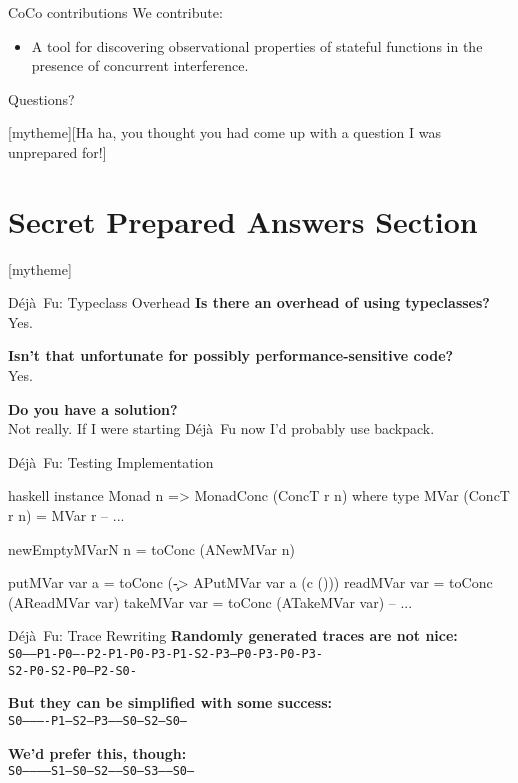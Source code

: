 \documentclass{beamer}
\newcommand{\sectiontext}[2]{%
\setbeamertemplate{section page}[mytheme][#2]%
\section{#1}%
\setbeamertemplate{section page}[mytheme]}
\newcommand{\dejafu}{D\'{e}j\`{a}~Fu}
\begin{document}
\begin{frame}{CoCo contributions}
  We contribute:

  \begin{itemize}
  \item A tool for discovering observational properties of stateful
    functions in the presence of concurrent interference.
\end{itemize}
\end{frame}

\begin{frame}[standout]
  Questions?
\end{frame}

\appendix

\sectiontext{Secret Prepared Answers Section}{Ha ha, you thought you had come up with a question I was unprepared for!}

\begin{frame}{\dejafu{}: Typeclass Overhead}
  \textbf{Is there an overhead of using typeclasses?}\\
  Yes.

  \textbf{Isn't that unfortunate for possibly performance-sensitive code?}\\
  Yes.

  \textbf{Do you have a solution?}\\
  Not really.  If I were starting \dejafu{} now I'd probably use backpack.
\end{frame}

\begin{frame}[fragile]{\dejafu{}: Testing Implementation}
\begin{center}
\begin{cminted}{haskell}
instance Monad n => MonadConc (ConcT r n) where
  type MVar (ConcT r n) = MVar r
  -- ...

  newEmptyMVarN n = toConc (ANewMVar n)

  putMVar  var a = toConc (\c -> APutMVar var a (c ()))
  readMVar var   = toConc (AReadMVar var)
  takeMVar var   = toConc (ATakeMVar var)
  -- ...
\end{cminted}
\end{center}
\end{frame}

\begin{frame}{\dejafu{}: Trace Rewriting}
  \textbf{Randomly generated traces are not nice:}\\
  \texttt{S0-----P1-P0----P2-P1-P0-P3-P1-S2-P3--P0-P3-P0-P3-}\\
  \texttt{S2-P0-S2-P0--P2-S0-}

  \textbf{But they can be simplified with some success:}\\
  \texttt{S0----------P1---S2--P3-----S0---S2---S0---}

  \textbf{We'd prefer this, though:}\\
  \texttt{S0------------S1---S0--S2-----S0--S3-----S0--}
\end{frame}
\end{document}
